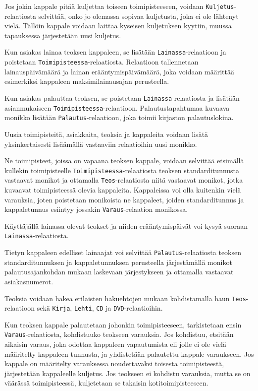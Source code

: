 \documentclass[12pt,titlepage] {article}
\begin{document}
Jos jokin kappale pitää kuljettaa toiseen toimipisteeseen, voidaan \texttt{Kuljetus}-relaatiosta selvittää, onko jo olemassa sopivaa kuljetusta, joka ei ole lähtenyt vielä. Tällöin kappale voidaan laittaa kyseisen kuljetuksen kyytiin, muussa tapauksessa järjestetään uusi kuljetus.

Kun asiakas lainaa teoksen kappaleen, se lisätään \texttt{Lainassa}-relaatioon ja poistetaan \texttt{Toimipisteessa}-relaatiosta. Relaatioon tallennetaan lainauspäivämäärä ja lainan erääntymispäivämäärä, joka voidaan määrittää esimerkiksi kappaleen maksimilainausajan perusteella.

Kun asiakas palauttaa teoksen, se poistetaan \texttt{Lainassa}-relaatiosta ja lisätään asianmukaiseen \texttt{Toimipisteessa}-relaatioon. Palautustapahtumaa kuvaava monikko lisätään \texttt{Palautus}-relaatioon, joka toimii kirjaston palautuslokina.

Uusia toimipisteitä, asiakkaita, teoksia ja kappaleita voidaan lisätä yksinkertaisesti lisäämällä vastaaviin relaatioihin uusi monikko.

Ne toimipisteet, joissa on vapaana teoksen kappale, voidaan selvittää etsimällä kullekin toimipisteelle \texttt{Toimipisteessa}-relaatiosta teoksen standarditunnusta vastaavat monikot ja ottamalla \texttt{Teos}-relaatiosta niitä vastaavat monikot, jotka kuvaavat toimipisteessä olevia kappaleita. Kappaleissa voi olla kuitenkin vielä varauksia, joten poistetaan monikoista ne kappaleet, joiden standarditunnus ja kappaletunnus esiintyy jossakin \texttt{Varaus}-relaation monikossa.

Käyttäjällä lainassa olevat teokset ja niiden erääntymispäivät voi kysyä suoraan \texttt{Lainassa}-relaatiosta.

Tietyn kappaleen edelliset lainaajat voi selvittää \texttt{Palautus}-relaatiosta teoksen standarditunnuksen ja kappaletunnuksen perusteella järjestämällä monikot palautusajankohdan mukaan laskevaan järjestykseen ja ottamalla vastaavat asiakasnumerot.

Teoksia voidaan hakea erilaisten hakuehtojen mukaan kohdistamalla haun \texttt{Teos}-relaatioon sekä \texttt{Kirja}, \texttt{Lehti}, \texttt{CD} ja \texttt{DVD}-relaatioihin.

Kun teoksen kappale palautetaan johonkin toimipisteeseen, tarkistetaan ensin \texttt{Varaus}-relaatiosta, kohdistuuko teokseen varauksia. Jos kohdistuu, etsitään aikaisin varaus, joka odottaa kappaleen vapautumista eli jolle ei ole vielä määritelty kappaleen tunnusta, ja yhdistetään palautettu kappale varaukseen. Jos kappale on määritelty varauksessa noudettavaksi toisesta toimipisteestä, järjestetään kappaleelle kuljetus. Jos teokseen ei kohdistu varauksia, mutta se on väärässä toimipisteessä, kuljetetaan se takaisin kotitoimipisteeseen.
\end{document}
